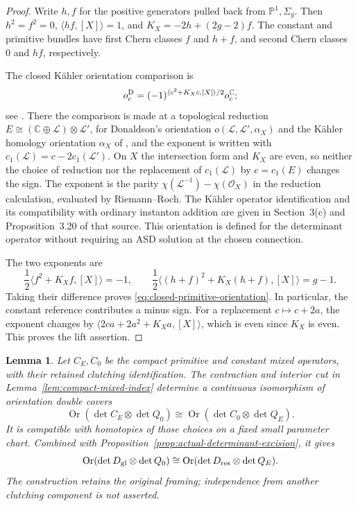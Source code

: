 \documentclass[11pt]{amsart}
\newtheorem{lemma}[theorem]{Lemma}
\theoremstyle{definition}
\theoremstyle{remark}
\theoremstyle{plain}
\newcommand{\CC}{\mathbb{C}}
\newcommand{\PP}{\mathbb{P}}
\newcommand{\cO}{\mathcal{O}}
\begin{document}
\begin{proof}
Write $h,f$ for the positive generators pulled back
from $\PP^1,\Sigma_g$. Then $h^2=f^2=0$,
$\langle hf,[X]\rangle=1$, and
$K_X=-2h+(2g-2)f$. The constant and primitive bundles have
first Chern classes $f$ and $h+f$, and second Chern
classes $0$ and $hf$, respectively.

The closed K\"ahler orientation comparison is
\[
 o_c^{\rm D}
   =(-1)^{\langle c^2+K_Xc,[X]\rangle/2}o_c^{\CC};
\]
see \cite[Proposition~3.25 and its proof,
pp.~418--419]{Donaldson87}. There the comparison is made
at a topological reduction
$E\cong(\CC\oplus\mathcal L)\otimes\mathcal L'$, for
Donaldson's orientation $o(\mathcal L,\mathcal L',\alpha_X)$
and the K\"ahler homology orientation $\alpha_X$
of \cite[p.~418]{Donaldson87}, and the exponent is written
with $c_1(\mathcal L)=c-2c_1(\mathcal L')$. On $X$ the
intersection form and $K_X$ are even, so neither the choice
of reduction nor the replacement of $c_1(\mathcal L)$ by
$c=c_1(E)$ changes the sign. The exponent is the parity
$\chi(\mathcal L^{-1})-\chi(\cO_X)$ in the reduction
calculation, evaluated by Riemann--Roch. The K\"ahler
operator identification and its compatibility with
ordinary instanton addition are given in Section~3(c)
and Proposition~3.20 of that source. This orientation
is defined for the determinant operator without requiring
an ASD solution at the chosen connection.

The two exponents are
\[
 \frac12\langle f^2+K_Xf,[X]\rangle=-1,\qquad
 \frac12\langle(h+f)^2+K_X(h+f),[X]\rangle=g-1.
\]
Taking their difference proves
\eqref{eq:closed-primitive-orientation}. In particular,
the constant reference contributes a minus sign.
For a replacement $c\mapsto c+2a$, the exponent changes
by $\langle2ca+2a^2+K_Xa,[X]\rangle$, which is even
since $K_X$ is even. This proves the lift assertion.
\end{proof}

\begin{lemma}\label{lem:interior-oriented-excision}
Let $C_E,C_0$ be the compact primitive and constant
mixed operators, with their retained clutching
identification. The contraction and interior cut in
Lemma~\ref{lem:compact-mixed-index} determine a
continuous isomorphism of orientation double covers
\begin{equation}\label{eq:interior-oriented-excision}
 \operatorname{Or}(\det C_E\otimes\det Q_0)
 \cong
 \operatorname{Or}(\det C_0\otimes\det Q_E).
\end{equation}
It is compatible with homotopies of those choices
on a fixed small parameter chart. Combined with
Proposition~\ref{prop:actual-determinant-excision},
it gives
\begin{equation}\label{eq:global-to-closed-excision}
 \operatorname{Or}(\det D_{\rm gl}\otimes\det Q_0)
 \cong
 \operatorname{Or}(\det D_{\rm res}\otimes\det Q_E).
\end{equation}
The construction retains the original framing;
independence from another clutching component is not
asserted.
\end{lemma}
\end{document}
